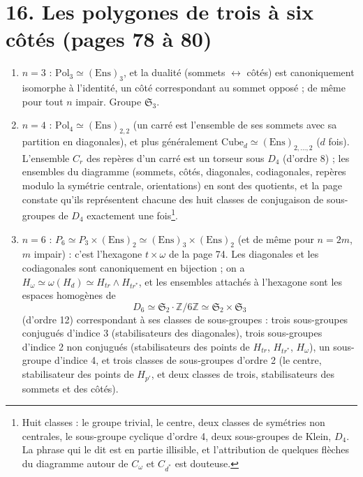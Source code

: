 \documentclass[11pt,a4paper]{article}
\begin{document}
\section*{16. Les polygones de trois à six côtés (pages 78 à 80)}

\begin{enumerate}
\item[1)] $n = 3$ : $\mathrm{Pol}_3 \simeq (\mathrm{Ens})_3$, et la dualité
  (sommets $\leftrightarrow$ côtés) est canoniquement isomorphe à l'identité,
  un côté correspondant au sommet opposé ; de même pour tout $n$ impair. Groupe
  $\mathfrak{S}_3$.
\item[2)] $n = 4$ : $\mathrm{Pol}_4 \simeq (\mathrm{Ens})_{2,2}$ (un carré est
  l'ensemble de ses sommets avec sa partition en diagonales), et plus généralement
  $\mathrm{Cube}_d \simeq (\mathrm{Ens})_{2, \ldots, 2}$ ($d$ fois). L'ensemble
  $C_r$ des repères d'un carré est un torseur sous $D_4$ (d'ordre 8) ; les
  ensembles du diagramme (sommets, côtés, diagonales, codiagonales, repères
  modulo la symétrie centrale, orientations) en sont des quotients, et la page
  constate qu'ils représentent chacune des huit classes de conjugaison de
  sous-groupes de $D_4$ exactement une fois\footnote{Huit classes : le groupe
  trivial, le centre, deux classes de symétries non centrales, le sous-groupe
  cyclique d'ordre 4, deux sous-groupes de Klein, $D_4$. La phrase qui le dit
  est en partie illisible, et l'attribution de quelques flèches du diagramme
  autour de $C_\omega$ et $C_{d^*}$ est douteuse.}.
\item[3)] $n = 6$ : $P_6 \simeq P_3 \times (\mathrm{Ens})_2 \simeq
  (\mathrm{Ens})_3 \times (\mathrm{Ens})_2$ (et de même pour $n = 2m$, $m$
  impair) : c'est l'hexagone $t \times \omega$ de la page 74. Les diagonales et
  les codiagonales sont canoniquement en bijection ; on a $H_\omega \simeq
  \omega(H_d) \simeq H_{tr} \wedge H_{tr^*}$, et les ensembles attachés à
  l'hexagone sont les espaces homogènes de
  \[
  D_6 \simeq \mathfrak{S}_2 \cdot \mathbb{Z}/6\mathbb{Z} \simeq \mathfrak{S}_2
  \times \mathfrak{S}_3
  \]
  (d'ordre 12) correspondant à ses classes de sous-groupes : trois sous-groupes
  conjugués d'indice 3 (stabilisateurs des diagonales), trois sous-groupes
  d'indice 2 non conjugués (stabilisateurs des points de $H_{tr}$,
  $H_{tr^*}$, $H_\omega$), un sous-groupe d'indice 4, et trois classes de
  sous-groupes d'ordre 2 (le centre, stabilisateur des points de $H_{p'}$, et
  deux classes de trois, stabilisateurs des sommets et des côtés).
\end{enumerate}
\end{document}
